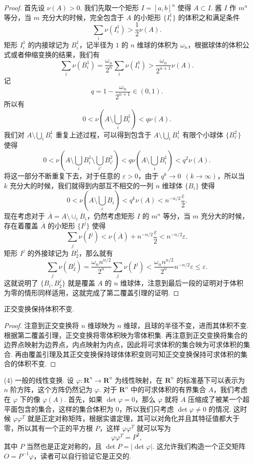 \begin{proof}
    首先设 $\nu(A)>0$. 我们先取一个矩形 $I = \left[a, b\right]^n$ 使得 $A\subset I$. 酱 $I$ 作 $m^n$ 等分，当 $m$ 充分大的时候，完全包含于 $A$ 的小矩形 $\{I_i^1\}$ 的体积之和满足条件 \[\sum_i\nu(I_i^1) > \frac12\nu(A).\]
    矩形 $I_i^1$ 的内接球记为 $B_i^1$，记半径为 $1$ 的 $n$ 维球的体积为 $\omega_n$，根据球体的体积公式或者伸缩变换的结果，我们有 \[\sum_i\nu(B_i^1) = \frac{\omega_n}{2^n}\sum_i\nu(I_i^1) > \frac{\omega_n}{2^{n+1}}\nu(A).\]
    记 \[q = 1 - \frac{\omega_n}{2^{n+1}}\in(0, 1).\]
    所以有 \[ 0 < \nu\left(A \setminus \bigcup_iB_i^1\right) < q\nu(A).\]
    我们对 $A\setminus \bigcup_iB_i^1$ 重复上述过程，可以得到包含于 $A\setminus \bigcup_iB_i^1$ 有限个小球体 $\{B_{i'}^2\}$ 使得 \[0 < \nu\left(A\setminus \bigcup_iB_i^1\setminus \bigcup_{i'}B_{i'}^2\right) < q\nu\left(A\setminus \bigcup_iB_i^1\right) < q^2\nu(A).\]
    将这一部分不断重复下去，对于任意的 $\varepsilon > 0$，由于 $q^k\to 0\enspace (k\to \infty)$，所以当 $k$ 充分大的时候，我们就得到内部互不相交的一列 $n$ 维球体 $\{B_i\}$ 使得 \[0 < \nu\left(A\setminus \bigcup_iB_i\right) < q^k\nu(A) < n^{-n/2}\frac{\varepsilon}{2}.\]
    现在考虑对于 $\overline{A} = A\setminus \cup_iB_i$，仍然考虑矩形 $I$ 的 $m^n$ 等分，当 $m$ 充分大的时候，存在着覆盖 $\overline{A}$ 的小矩形 $\{I^j\}$ 使得 \[\sum_j\nu(I^j) < \nu(\overline{A}) + n^{-n/2}\frac{\varepsilon}{2} < n^{-n/2}\varepsilon.\]
    矩形 $I^j$ 的外接球记为 $B_2^j$，那么就有 \[\sum_j\nu(B_2^j) = \frac{\omega_nn^{n/2}}{2^n}\sum_j\nu(I^j) < \frac{\omega_nn^{n/2}}{2^n}n^{-n/2}\varepsilon \leqslant \varepsilon.\]
    这就说明了 $\{B_i, B_2^j\}$ 就是覆盖 $A$ 的 $n$ 维球体，注意到最后一段的证明对于体积为零的情形同样适用，这就完成了第二覆盖引理的证明.
\end{proof}

\begin{theorem}{}{}
    正交变换保持体积不变.
\end{theorem}

\begin{proof}
    注意到正交变换将 $n$ 维球映为 $n$ 维球，且球的半径不变，进而其体积不变. 根据第二覆盖引理，正交变换将零体积映为零体积集. 再注意到正交变换将集合的边界点映射为边界点，内点映射为内点，因此将可求体积的集合映为可求体积的集合. 再由覆盖引理及其正交变换保持球体体积变则可知正交变换保持可求体积的集合的体积不变.
\end{proof}

(4) 一般的线性变换. 设 $\varphi: \mathbf{R}^n\to \mathbf{R}^n$ 为线性映射，在 $\mathbf{R}^n$ 的标准基下可以表示为 $n$ 阶方阵，这个方阵仍然记为 $\varphi$. 对于 $\mathbf{R}^n$ 中的可求体积的有界集合 $A$，我们考虑在 $\varphi$ 下的像 $\varphi(A)$. 首先，如果 $\det\varphi = 0$，那么 $\varphi$ 就将 $A$ 压缩成了被某一个超平面包含的集合，这样的集合体积为 $0$，所以我们只考虑 $\det\varphi\neq 0$ 的情况. 这时候 $\varphi\varphi^T$ 就是正定对称矩阵，根据实谱定理，其可以对角化并且其特征值都大于零，所以其有一个正的平方根 $P$，这样 $\varphi\varphi^T$ 就可以写为 \[\varphi\varphi^T = P^2,\]
其中 $P$ 当然也是正定对称的，且 $\det P = \vert\det\varphi\vert$. 这允许我们构造一个正交矩阵 $O = P^{-1}\varphi$，读者可以自行验证它是正交的.

